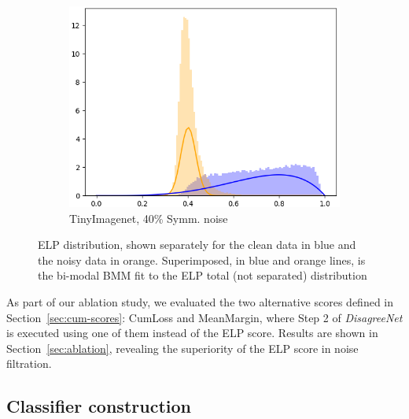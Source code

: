 \documentclass{article}
\begin{document}
\begin{figure}[htbp]
\begin{subfigure}[tb]{0.3\textwidth}
  \end{subfigure}
\hspace{.2cm}
  \begin{subfigure}[tb]{0.3\textwidth}
  \includegraphics[width=\linewidth]{figs/BMMTinyImagenetsymmetric40.png}
  \centering
  \scriptsize{TinyImagenet, 40\% Symm. noise}
  \end{subfigure}
      \caption[Estimation]{ELP distribution, shown separately for the clean data in blue and the noisy data in orange. Superimposed, in blue and orange lines, is the bi-modal BMM fit to the ELP total (not separated) distribution}
      \label{fig:bmm-fit}
\end{figure}

As part of our ablation study, we evaluated the two alternative scores defined in Section~\ref{sec:cum-scores}: CumLoss and MeanMargin, where Step 2 of \emph{DisagreeNet} is executed using one of them instead of the ELP score. Results are shown in Section~\ref{sec:ablation}, revealing the superiority of the ELP score in  noise filtration. 

\subsection{Classifier construction}
\end{document}
